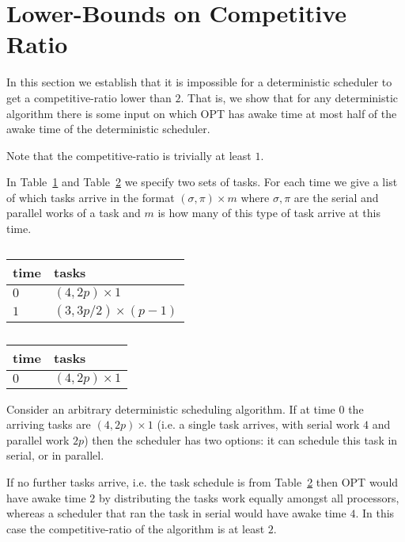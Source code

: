 \documentclass[twocolumn]{article}[10pt]
\begin{document}
\section{Lower-Bounds on Competitive Ratio}

In this section we establish that it is impossible for a
deterministic scheduler to get a competitive-ratio lower than
$2$. That is, we show that for any deterministic algorithm there
is some input on which OPT has awake time at most half of the
awake time of the deterministic scheduler.

Note that the competitive-ratio is trivially at least $1$.

In Table~\ref{tab:lowerboundFork1} and
Table~\ref{tab:lowerboundFork2} we specify two sets of tasks.
For each time we give a list of which tasks arrive in the format
$(\sigma, \pi)\times m$ where $\sigma, \pi$ are the serial and
parallel works of a task and $m$ is how many of this type of task
arrive at this time.

\begin{table}[H]
\caption{}
\label{tab:lowerboundFork1}
\centering
\begin{tabular}{|l|l|}
\hline
time & tasks                    \\ \hline
$0$  & $(4, 2p) \times 1$       \\ \hline
$1$  & $(3, 3p/2) \times (p-1)$ \\ \hline
\end{tabular}
\end{table}

\begin{table}[H]
\caption{}
\label{tab:lowerboundFork2}
\centering
\begin{tabular}{|l|l|}
\hline
time & tasks                    \\ \hline
$0$  & $(4, 2p) \times 1$       \\ \hline
\end{tabular}
\end{table}

Consider an arbitrary deterministic scheduling algorithm. If at
time $0$ the arriving tasks are $(4, 2p)\times 1$ (i.e. a single
task arrives, with serial work $4$ and parallel work $2p$) then
the scheduler has two options: it can schedule this task in
serial, or in parallel.

If no further tasks arrive, i.e. the task schedule is from
Table~\ref{tab:lowerboundFork2} then OPT would have awake time
$2$ by distributing the tasks work equally amongst all
processors, whereas a scheduler that ran the task in serial would
have awake time $4$. In this case the competitive-ratio of the
algorithm is at least $2$.
\end{document}
